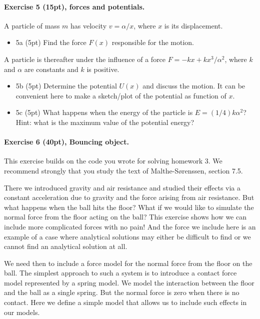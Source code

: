 \documentclass[%
oneside,                 %
final,                   %
10pt]{article}
\begin{document}
\noindent
\paragraph{Exercise 5 (15pt), forces  and potentials.}
A particle of mass $m$ has velocity $v=\alpha/x$, where $x$ is its displacement.

\begin{itemize}
\item 5a (5pt) Find the force $F(x)$ responsible for the motion.
\end{itemize}

\noindent
A particle is thereafter under the influence of a force $F=-kx+kx^3/\alpha^2$, where $k$ and $\alpha$ are constants and $k$ is positive.

\begin{itemize}
\item 5b (5pt) Determine the potential $U(x)$  and discuss the motion. It can be convenient here to make a sketch/plot of the potential as function of $x$.

\item 5c (5pt)  What happens when the energy of the particle is $E=(1/4)k\alpha^2$? Hint: what is the maximum value of the potential energy?
\end{itemize}

\noindent
\paragraph{Exercise 6 (40pt), Bouncing object.}
This exercise builds on the code you wrote for solving homework 3.
We recommend strongly that you study the text of Malthe-Sørenssen, section 7.5.

There we introduced gravity and air resistance and studied their
effects via a constant acceleration due to gravity and the force
arising from air resistance. But what happens when the ball hits the
floor? What if we would like to simulate the normal force from the
floor acting on the ball?  This exercise shows how we can include more
complicated forces with no pain! And the force we include here is an
example of a case where analytical solutions may either be difficult
to find or we cannot find an analytical solution at all.

We need then to include a force model for the normal force from the
floor on the ball. The simplest approach to such a system is to
introduce a contact force model represented by a spring model.  We
model the interaction between the floor and the ball as a single
spring. But the normal force is zero when there is no contact. Here we
define a simple model that allows us to include such effects in our
models.
\end{document}
